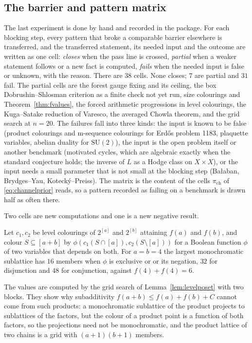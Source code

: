 \subsection{The barrier and pattern matrix}\label{ssec:matrix}

The last experiment is done by hand and recorded in the package. For each blocking step, every pattern that broke a comparable barrier elsewhere is transferred, and the transferred statement, its needed input and the outcome are written as one cell: \emph{closes} when the pass line is crossed, \emph{partial} when a weaker statement follows or a new fact is computed, \emph{fails} when the needed input is false or unknown, with the reason. There are $38$ cells. None closes; $7$ are partial and $31$ fail. The partial cells are the forest gauge fixing and its ceiling, the box Dobrushin--Shlosman criterion as a finite check not yet run, size colourings and Theorem~\ref{thm:fvalues}, the forced arithmetic progressions in level colourings, the Kuga--Satake reduction of Varesco, the averaged Chowla theorem, and the grid search at $n=20$. The failures fall into three kinds: the input is known to be false (product colourings and m-sequence colourings for Erd\H{o}s problem 1183, plaquette variables, abelian duality for $\mathrm{SU}(2)$), the input is the open problem itself or another benchmark (motivated cycles, which are algebraic exactly when the standard conjecture holds; the inverse of $L$ as a Hodge class on $X\times X$), or the input needs a small parameter that is not small at the blocking step (Ba{\l}aban, Brydges--Yau, Kotecký--Preiss). The matrix is the content of the cells $\pi_{\mathrm{ch}}$ of \eqref{eq:channelprior} reads, so a pattern recorded as failing on a benchmark is drawn half as often there.

Two cells are new computations and one is a new negative result.

\begin{proposition}\label{prop:productrules}
Let $c_{1},c_{2}$ be level colourings of $2^{[a]}$ and $2^{[b]}$ attaining $f(a)$ and $f(b)$, and colour $S\subseteq[a+b]$ by $\phi(c_{1}(S\cap[a]),c_{2}(S\setminus[a]))$ for a Boolean function $\phi$ of two variables that depends on both. For $a=b=4$ the largest monochromatic sublattice has $16$ members when $\phi$ is exclusive or or its negation, $32$ for disjunction and $48$ for conjunction, against $f(4)+f(4)=6$.
\end{proposition}

The values are computed by the grid search of Lemma~\ref{lem:levelposet} with two blocks. They show why subadditivity $f(a+b)\le f(a)+f(b)+C$ cannot come from such products: a monochromatic sublattice of the product projects to sublattices of the factors, but the colour of a product point is a function of both factors, so the projections need not be monochromatic, and the product lattice of two chains is a grid with $(a+1)(b+1)$ members.

